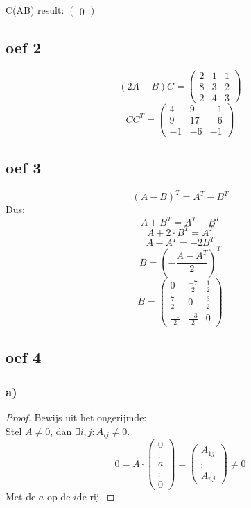 \documentclass[10pt,a4paper]{article}
\begin{document}
C(AB) result:
$
\begin{pmatrix}
0
\end{pmatrix}
$

\subsection*{oef 2}
\[(2A-B)C = 
\begin{pmatrix}
2 &  1 &  1\\
8 &  3 &  2\\
2 &  4 &  3
\end{pmatrix}
\]
\[ CC^T =
\begin{pmatrix}
4 &  9 &  -1\\
9 &  17 &  -6\\
-1 &  -6 &  -1
\end{pmatrix}
\]

\subsection*{oef 3}
$$(A - B)^T = A^T - B^T$$
Dus:
$$A+B^T = A^T - B^T$$
$$A+2\cdot B^T = A^T$$
$$A - A^T = -2B^T$$
$$B = \left(-\frac{A - A^T}{2}\right)^T$$
$$ B = 
\begin{pmatrix}
0 & \frac{-7}{2} & \frac{1}{2}\\
\frac{7}{2} & 0 & \frac{3}{2}\\
\frac{-1}{2} & \frac{-3}{2} & 0
\end{pmatrix}
$$
\subsection*{oef 4}
\subsubsection*{a)}
\begin{proof}
Bewijs uit het ongerijmde:\\
Stel $A \neq 0$, dan $\exists i, j: A_{ij} \neq 0$.
\[
0= A \cdot
\begin{pmatrix}
0\\\vdots\\a\\\vdots\\0
\end{pmatrix}
=
\begin{pmatrix}
A_{1j}\\\vdots\\A_{nj}
\end{pmatrix}
\neq 0
\]
Met de $a$ op de $i$de rij.
\end{proof}
\end{document}
